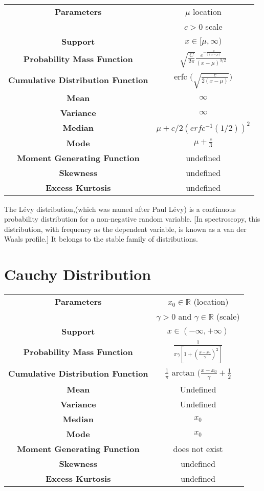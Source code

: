 \documentclass[14pt, a4paper]{article}
\theoremstyle{definition}
\newcommand{\R}{\mathbb{R}}
\begin{document}
\begin{tabular}{|c|c|}  %
\hline
 \textbf{Parameters }& $\mu$ location \\ & $c > 0$ scale \\
 \hline
 \textbf{Support} & $ x \in [ \mu, \infty )$ \\
 \hline
 \textbf{Probability Mass Function} & $\sqrt{\frac{C}{2\pi}} \frac{e^{- \frac{e}{2(x - \mu)} }}{(x-\mu)^{3/2}}$ \\
 \hline
 \textbf{Cumulative Distribution Function} &  erfc $\Bigg( \sqrt{\frac{c}{2(x - \mu)}} \Bigg)$\\
 \hline
 \textbf{Mean} & $\infty$ \\ 
 \hline
 \textbf{Variance} & $\infty$ \\
 \hline
 \textbf{Median} & $\mu + c/2(erfc^{-1} (1/2))^2$ \\ 
 \hline
 \textbf{Mode} & $\mu + \frac{c}{3}$ \\
 \hline
 \textbf{Moment Generating Function} & undefined \\
 \hline
 \textbf{Skewness} & undefined\\
 \hline
 \textbf{Excess Kurtosis} & undefined \\
 \hline
       
  \end{tabular}
The Lévy distribution,(which was named after Paul Lévy) is a continuous probability distribution for a non-negative random variable. [In spectroscopy, this distribution, with frequency as the dependent variable, is known as a van der Waals profile.] It belongs to the stable family of distributions. 
  
\section{Cauchy Distribution}


\begin{tabular}{|c|c|}  %
\hline
 \textbf{Parameters }& $x_0 \in \R$ (location) \\ & $\gamma > 0 $ and $\gamma \in \R$ (scale) \\
 \hline
 \textbf{Support} & $x \in (- \infty , + \infty)$ \\
 \hline
 \textbf{Probability Mass Function} &  $\frac{1}{\pi \gamma [1 + (\frac{x-x_0}{\gamma})^2 ]}$\\
 \hline
 \textbf{Cumulative Distribution Function} &  $\frac{1}{\pi}$ arctan $\Big( \frac{x - x_0}{\gamma} + \frac{1}{2}$\\
 \hline
 \textbf{Mean} & Undefined \\ 
 \hline
 \textbf{Variance} & Undefined \\
 \hline
 \textbf{Median} & $x_0$ \\ 
 \hline
 \textbf{Mode} & $x_0$ \\
 \hline
 \textbf{Moment Generating Function} & does not exist\\
 \hline
 \textbf{Skewness} & undefined\\
 \hline
 \textbf{Excess Kurtosis} & undefined \\
 \hline
       
  \end{tabular}
  
\end{document}
